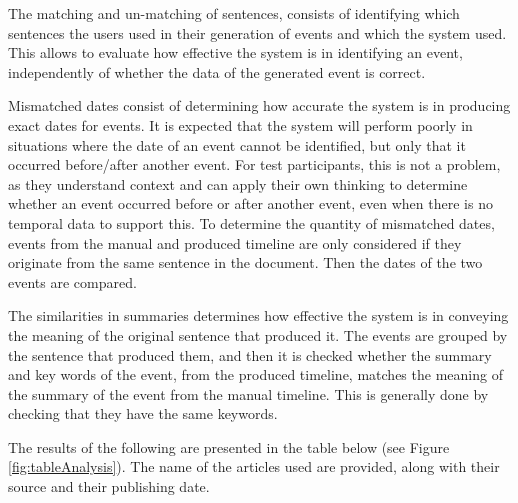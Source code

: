 \par The matching and un-matching of sentences, consists of identifying which sentences the users used in their generation of events and which the system used. This allows to evaluate how effective the system is in identifying an event, independently of whether the data of the generated event is correct.

\par Mismatched dates consist of determining how accurate the system is in producing exact dates for events. It is expected that the system will perform poorly in situations where the date of an event cannot be identified, but only that it occurred before/after another event. For test participants, this is not a problem, as they understand context and can apply their own thinking to determine whether an event occurred before or after another event, even when there is no temporal data to support this. To determine the quantity of mismatched dates, events from the manual and produced timeline are only considered if they originate from the same sentence in the document. Then the dates of the two events are compared.

\par The similarities in summaries determines how effective the system is in conveying the meaning of the original sentence that produced it. The events are grouped by the sentence that produced them, and then it is checked whether the summary and key words of the event, from the produced timeline, matches the meaning of the summary of the event from the manual timeline. This is generally done by checking that they have the same keywords.

\par The results of the following are presented in the table below (see Figure \ref{fig:tableAnalysis}). The name of the articles used are provided, along with their source and their publishing date.

